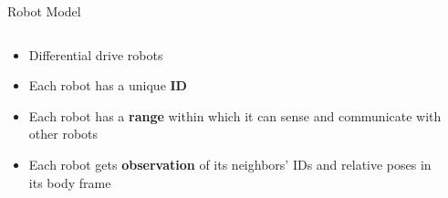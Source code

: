 \begin{frame}{Robot Model}{}
  \begin{columns}[T] %
    \begin{column}{.55\textwidth}
      \begin{itemize}
      \item Differential drive robots
      \item Each robot has a unique \textbf{ID}
      \item Each robot has a \textbf{range} within which it can
        sense and communicate with other robots
      \item Each robot gets \textbf{observation} of its neighbors'
        IDs and relative poses in its body frame
      \end{itemize}
    \end{column}%
    \begin{column}{.45\textwidth}
        
    \end{column}%
  \end{columns}
\end{frame}